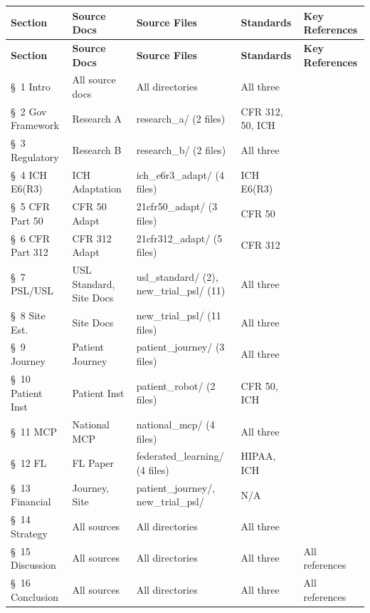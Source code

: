 \begin{longtable}{>{\raggedright\arraybackslash}p{2.6cm} >{\raggedright\arraybackslash}p{3cm} >{\raggedright\arraybackslash}p{3.6cm} >{\raggedright\arraybackslash}p{2.3cm} >{\raggedright\arraybackslash}p{3.5cm}}
\toprule
\textbf{Section} & \textbf{Source Docs} & \textbf{Source Files} & \textbf{Standards} & \textbf{Key References} \\
\midrule
\endfirsthead
\toprule
\textbf{Section} & \textbf{Source Docs} & \textbf{Source Files} & \textbf{Standards} & \textbf{Key References} \\
\midrule
\endhead
\bottomrule
\endfoot
\S~1 Intro & All source docs & All directories & All three & \cite{tufts-delay, fda-clinical-trials-guidance, nci-clinical-trials} \\
\S~2 Gov Framework & Research A & research\_a/ (2 files) & CFR 312, 50, ICH & \cite{cfr-part-312, cfr-part-50, ich-e6r3, hipaa} \\
\S~3 Regulatory & Research B & research\_b/ (2 files) & All three & \cite{ich-adapt, cfr50-adapt, cfr312-adapt} \\
\S~4 ICH E6(R3) & ICH Adaptation & ich\_e6r3\_adapt/ (4 files) & ICH E6(R3) & \cite{ich-adapt, ich-e6r3, usl-standard} \\
\S~5 CFR Part 50 & CFR 50 Adapt & 21cfr50\_adapt/ (3 files) & 21 CFR 50 & \cite{cfr50-adapt, cfr-part-50} \\
\S~6 CFR Part 312 & CFR 312 Adapt & 21cfr312\_adapt/ (5 files) & 21 CFR 312 & \cite{cfr312-adapt, cfr-part-312} \\
\S~7 PSL/USL & USL Standard, Site Docs & usl\_standard/ (2), new\_trial\_psl/ (11) & All three & \cite{usl-standard, site-docs} \\
\S~8 Site Est. & Site Docs & new\_trial\_psl/ (11 files) & All three & \cite{site-docs, ich-adapt, cfr50-adapt} \\
\S~9 Journey & Patient Journey & patient\_journey/ (3 files) & All three & \cite{patient-journey-paper, usl-standard} \\
\S~10 Patient Inst & Patient Inst & patient\_robot/ (2 files) & CFR 50, ICH & \cite{patient-instructions-paper, cfr50-adapt} \\
\S~11 MCP & National MCP & national\_mcp/ (4 files) & All three & \cite{national-mcp-paper, mcp-protocol, mcp-repo} \\
\S~12 FL & FL Paper & federated\_learning/ (4 files) & HIPAA, ICH & \cite{fl-paper, fl-repo, federated-learning-healthcare} \\
\S~13 Financial & Journey, Site & patient\_journey/, new\_trial\_psl/ & N/A & \cite{tufts-delay, nci-trials-paying} \\
\S~14 Strategy & All sources & All directories & All three & \cite{main-repo, mcp-repo, fl-repo} \\
\S~15 Discussion & All sources & All directories & All three & All references \\
\S~16 Conclusion & All sources & All directories & All three & All references \\
\end{longtable}


